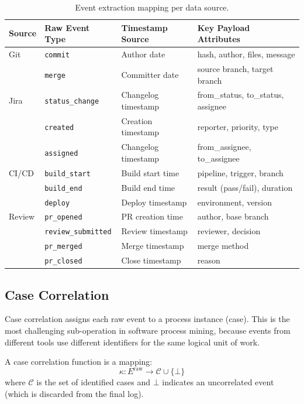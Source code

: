 \begin{table}[htbp]
\centering
\caption{Event extraction mapping per data source.}
\label{tab:event-extraction}
\small
\begin{tabular}{llll}
\toprule
\textbf{Source} & \textbf{Raw Event Type} & \textbf{Timestamp Source} & \textbf{Key Payload Attributes} \\
\midrule
Git & \texttt{commit} & Author date & hash, author, files, message \\
    & \texttt{merge} & Committer date & source branch, target branch \\
\midrule
Jira & \texttt{status\_change} & Changelog timestamp & from\_status, to\_status, assignee \\
     & \texttt{created} & Creation timestamp & reporter, priority, type \\
     & \texttt{assigned} & Changelog timestamp & from\_assignee, to\_assignee \\
\midrule
CI/CD & \texttt{build\_start} & Build start time & pipeline, trigger, branch \\
      & \texttt{build\_end} & Build end time & result (pass/fail), duration \\
      & \texttt{deploy} & Deploy timestamp & environment, version \\
\midrule
Review & \texttt{pr\_opened} & PR creation time & author, base branch \\
       & \texttt{review\_submitted} & Review timestamp & reviewer, decision \\
       & \texttt{pr\_merged} & Merge timestamp & merge method \\
       & \texttt{pr\_closed} & Close timestamp & reason \\
\bottomrule
\end{tabular}
\end{table}


\subsection{Case Correlation}
\label{sec:s1-correlation}

Case correlation assigns each raw event to a process instance (case). This 
is the most challenging sub-operation in software process mining, because 
events from different tools use different identifiers for the same logical 
unit of work.

\begin{definition}
\label{def:correlation}
A case correlation function is a mapping:
\begin{equation}
\label{eq:correlation}
\kappa : E^{\text{raw}} \to \mathcal{C} \cup \{\bot\}
\end{equation}
where $\mathcal{C}$ is the set of identified cases and $\bot$ indicates 
an uncorrelated event (which is discarded from the final log).
\end{definition}

